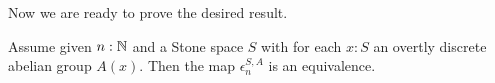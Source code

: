 Now we are ready to prove the desired result.



\begin{theorem}\label{eilenberg-exponentials}
Assume given $n:\mathbb{N}$ and a Stone space $S$ with for each $x:S$ an overtly discrete abelian group $A(x)$. Then the map $\epsilon_n^{S,A}$ is an equivalence.
\end{theorem}

